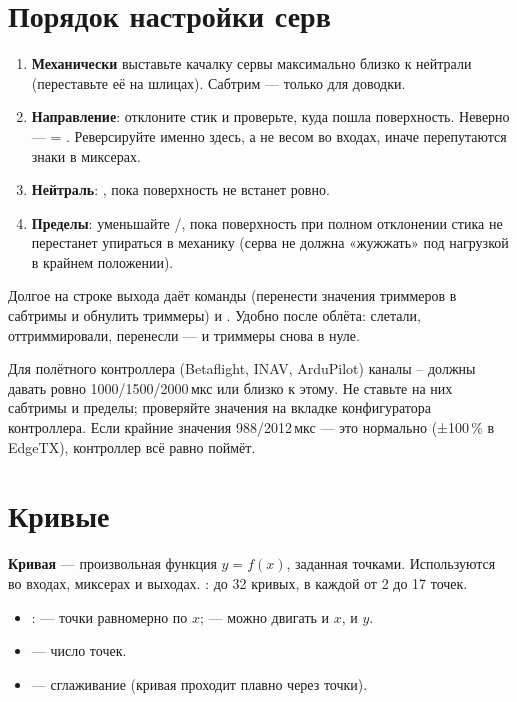 \section{Порядок настройки серв}

\begin{enumerate}
  \item \textbf{Механически} выставьте качалку сервы максимально близко к нейтрали
        (переставьте её на шлицах). Сабтрим --- только для доводки.
  \item \textbf{Направление}: отклоните стик и проверьте, куда пошла поверхность. Неверно ---
         = . Реверсируйте именно здесь, а не весом во входах,
        иначе перепутаются знаки в миксерах.
  \item \textbf{Нейтраль}: , пока поверхность не встанет ровно.
  \item \textbf{Пределы}: уменьшайте /, пока поверхность при полном
        отклонении стика не перестанет упираться в механику (серва не должна «жужжать»
        под нагрузкой в крайнем положении).
\end{enumerate}

\begin{tip}
Долгое  на строке выхода даёт команды  (перенести
значения триммеров в сабтримы и обнулить триммеры) и . Удобно
после облёта: слетали, оттриммировали, перенесли --- и триммеры снова в нуле.
\end{tip}

\begin{caution}
Для полётного контроллера (Betaflight, INAV, ArduPilot) каналы -- должны давать
ровно 1000/1500/2000\,мкс или близко к этому. Не ставьте на них сабтримы и пределы;
проверяйте значения на вкладке  конфигуратора контроллера. Если крайние
значения 988/2012\,мкс --- это нормально (±100\,\% в EdgeTX), контроллер всё равно поймёт.
\end{caution}

\section{Кривые}

\textbf{Кривая} --- произвольная функция $y = f(x)$, заданная точками. Используются
во входах, миксерах и выходах. : до 32 кривых, в каждой
от 2 до 17 точек.

\begin{itemize}
  \item {}:  --- точки равномерно по $x$;  --- можно
        двигать и $x$, и $y$.
  \item {} --- число точек.
  \item {} --- сглаживание (кривая проходит плавно через точки).
\end{itemize}


